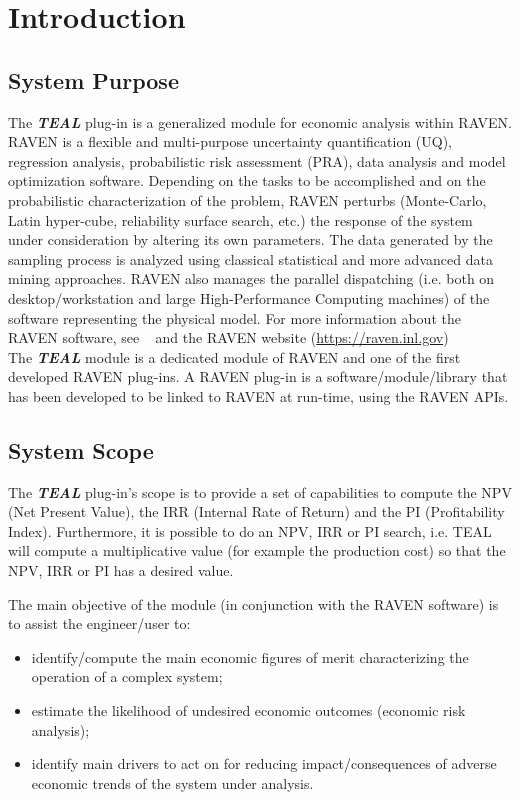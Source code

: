 \section{Introduction}
\subsection{System Purpose}

The \textbf{\textit{TEAL}} plug-in is a generalized module for economic analysis within RAVEN.
\\RAVEN is a flexible and multi-purpose uncertainty quantification (UQ), regression analysis, probabilistic risk assessment 
(PRA), data analysis and model optimization software.  Depending on the tasks to be accomplished and on the 
probabilistic
 characterization of the problem, RAVEN perturbs (Monte-Carlo, Latin hyper-cube, reliability surface search, etc.) the
 response of the system under consideration by altering its own parameters. 
 The data generated by the sampling process is analyzed using classical statistical
 and more advanced data mining approaches. RAVEN also manages the parallel dispatching (i.e. both on
 desktop/workstation and large High-Performance Computing machines) of the software representing the physical 
 model.
 For more information about the RAVEN software, see ~\cite{RAVENuserManual} and the RAVEN website (\url{https://raven.inl.gov})
\\The  \textbf{\textit{TEAL}} module is a dedicated module of RAVEN and one of the first developed RAVEN plug-ins.
A RAVEN plug-in is a software/module/library that has been developed to be linked to RAVEN at run-time, using the RAVEN APIs.


\subsection{System Scope}

The \textbf{\textit{TEAL}} plug-in’s scope is to provide a set of capabilities to compute the NPV (Net Present Value), the IRR
(Internal Rate of Return) and the PI (Profitability Index). Furthermore, it is possible to do an NPV, IRR or PI search, i.e. TEAL will
compute a multiplicative value (for example the production cost) so that the NPV, IRR or PI has a desired value.

 The main objective of the module (in conjunction with the RAVEN software) is to assist the engineer/user to:
\begin{itemize}
  \item identify/compute the main economic figures of merit characterizing the operation of a complex system;
  \item estimate the likelihood of undesired economic outcomes (economic risk analysis);
  \item identify main drivers to act on for reducing impact/consequences of adverse economic trends of the 
         system under analysis.
\end{itemize}


